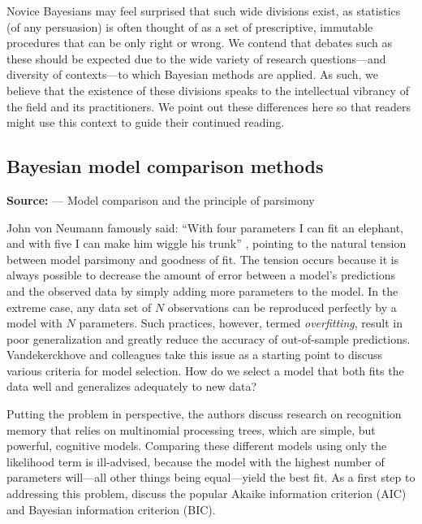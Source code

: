 Novice Bayesians may feel surprised that such wide divisions exist, as statistics (of any persuasion) is often thought of as a set of prescriptive, immutable procedures that can be only right or wrong.  We contend that debates such as these should be expected due to the wide variety of research questions---and diversity of contexts---to which Bayesian methods are applied. As such, we believe that the existence of these divisions speaks to the intellectual vibrancy of the field and its practitioners. We point out these differences here so that readers might use this context to guide their continued reading. 

\subsection{Bayesian model comparison methods}
\noindent\textbf{Source:}  --- Model comparison and the principle of parsimony
\vspace{2mm}

John von Neumann famously said: ``With four parameters I can fit an elephant, and with five I can make him wiggle his trunk'' \cite<as quoted in>[p. 698]{mayer2010}, pointing to the natural tension between model parsimony and goodness of fit. The tension occurs because it is always possible to decrease the amount of error between a model's predictions and the observed data by simply adding more parameters to the model. In the extreme case, any data set of $N$ observations can be reproduced perfectly by a model with $N$ parameters. Such practices, however, termed \emph{overfitting}, result in poor generalization and greatly reduce the accuracy of out-of-sample predictions.
Vandekerckhove and colleagues \citeyear{vandekerckhove2015model} take this issue as a starting point to discuss various criteria for model selection. How do we select a model that both fits the data well and generalizes adequately to new data?

Putting the problem in perspective, the authors discuss research on recognition memory that relies on multinomial processing trees, which are simple, but powerful, cognitive models. Comparing these different models using only the likelihood term is ill-advised, because the model with the highest number of parameters will---all other things being equal---yield the best fit. As a first step to addressing this problem,  discuss the popular Akaike information criterion (AIC) and Bayesian information criterion (BIC).

